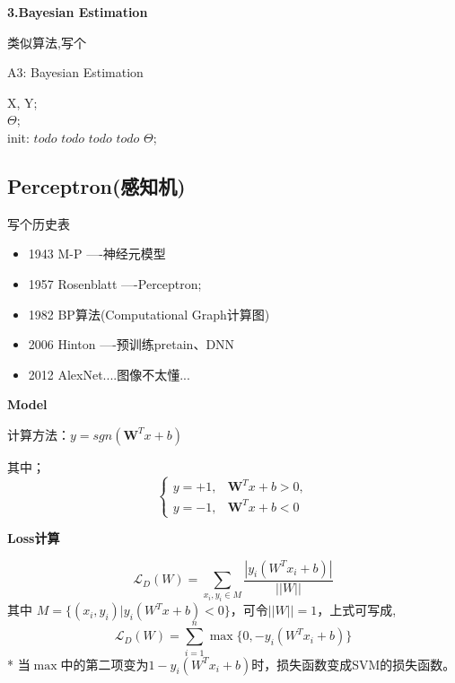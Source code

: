 \documentclass[UTF8]{ctexart}
\begin{document}
\textbf{3.Bayesian Estimation}

类似算法,写个

\begin{algorithm}[htb]
    \caption{A3: Bayesian Estimation}
    \label{alg:A3}
    \begin{algorithmic}[1]
    \REQUIRE
    X, Y; \\
    \ENSURE 
    $\Theta$; \\
    \STATE init: $todo$
    \REPEAT 
    \STATE $todo$
    \STATE $todo$
    \UNTIL $todo$
    \RETURN $\Theta$;
    \end{algorithmic}
\end{algorithm}


\subsection{Perceptron(感知机)}

写个历史表
\begin{itemize}
    \item 1943 M-P ----神经元模型
    \item 1957 Rosenblatt ----Perceptron;
    \item 1982 BP算法(Computational Graph计算图)
    \item 2006 Hinton ----预训练pretain、DNN
    \item 2012 AlexNet....图像不太懂...
\end{itemize}

\textbf{Model}

计算方法：$y=sgn(\mathbf{W}^Tx+b)$

其中；
\begin{equation*}
    \left\{ \begin{aligned}
        y=+1, &\mathbf{W}^Tx+b > 0 , \\ 
        y=-1, &\mathbf{W}^Tx+b<0 
    \end{aligned}
    \right.
\end{equation*}

\textbf{Loss计算}

\begin{equation*}
    \mathcal{L}_D(W) = \sum_{x_i, y_i \in M} \frac{|y_i (W^Tx_i+b)|}{||W||}
\end{equation*}
其中 $M = \{(x_i, y_i) | y_i(W^Tx+b)<0\}$，可令$||W||=1$，上式可写成,
\begin{equation*}
    \mathcal{L}_D(W) = \sum_{i=1}^n\max\{0, -y_i(W^Tx_i+b)\} 
\end{equation*}
* 当$\max$中的第二项变为$1-y_i(W^Tx_i+b)$时，损失函数变成SVM的损失函数。
\end{document}
